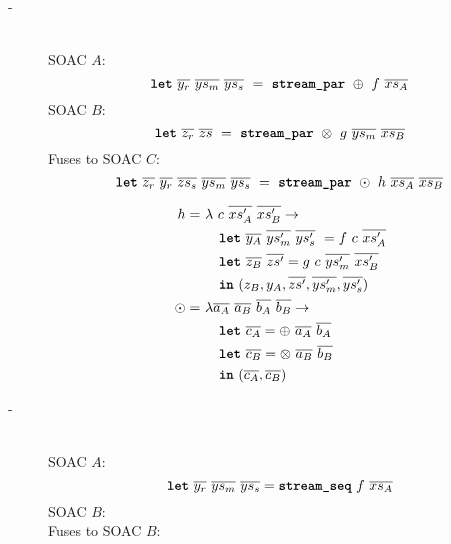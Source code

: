 \begin{description}
\item[-]\hfill\\

  SOAC $A$:
  \[
    \mbox{\texttt{\bfseries{let}}}~\overline{y_{r}}~\overline{ys_{m}}~\overline{ys_{s}}~=~\mbox{\texttt{\bfseries{stream\_par}}}~\oplus~f~\overline{xs_{A}}
  \]
  SOAC $B$:
  \[
    \mbox{\texttt{\bfseries{let}}}~\overline{z_{r}}~\overline{zs}~=~\mbox{\texttt{\bfseries{stream\_par}}}~\otimes~g~\overline{ys_{m}}~\overline{xs_{B}}
  \]
  Fuses to SOAC $C$:
  \[
    \mbox{\texttt{\bfseries{let}}}~\overline{z_{r}}~\overline{y_{r}}~\overline{zs_{s}}~\overline{ys_{m}}~\overline{ys_{s}}~=~\mbox{\texttt{\bfseries{stream\_par}}}~\odot~h~\overline{xs_{A}}~\overline{xs_{B}}
  \]

  \begin{align*}
    h =~& \lambda~c~\overline{xs'_{A}}~\overline{xs'_{B}} \rightarrow \\
        & \quad \mbox{\texttt{\bfseries{let}}}~\overline{y_{A}}~\overline{ys'_{m}}~\overline{ys'_{s}}~ = f~c~\overline{xs'_{A}} \\
        & \quad \mbox{\texttt{\bfseries{let}}}~\overline{z_{B}}~\overline{zs'} = g~c~\overline{ys'_{m}}~\overline{xs'_{B}} \\
        & \quad \mbox{\texttt{\bfseries{in}}}~(z_{B},y_{A},\overline{zs'},\overline{ys'_{m}},\overline{ys'_{s}}) \\
    \odot =~& \lambda \overline{a_{A}}~\overline{a_{B}}~\overline{b_{A}}~\overline{b_{B}} \rightarrow \\
        & \quad \mbox{\texttt{\bfseries{let}}}~\overline{c_{A}} = \oplus~\overline{a_{A}}~\overline{b_{A}} \\
        & \quad \mbox{\texttt{\bfseries{let}}}~\overline{c_{B}} = \otimes~\overline{a_{B}}~\overline{b_{B}} \\
        & \quad \mbox{\texttt{\bfseries{in}}}~(\overline{c_{A}}, \overline{c_{B}})
  \end{align*}

\item[-]\hfill\\

  SOAC $A$:
  \[
    \mbox{\texttt{\bfseries{let}}}~\overline{y_{r}}~\overline{ys_{m}}~\overline{ys_{s}} = \mbox{\texttt{\bfseries{stream\_seq}}}~f~\overline{xs_{A}}
  \]
  SOAC $B$:
  \[
  \]
  Fuses to SOAC $B$:
  \[
  \]

\end{description}



